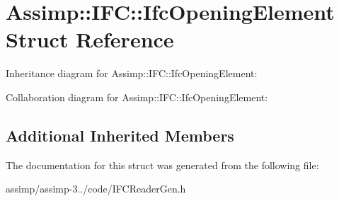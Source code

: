 \hypertarget{struct_assimp_1_1_i_f_c_1_1_ifc_opening_element}{\section{Assimp\+:\+:I\+F\+C\+:\+:Ifc\+Opening\+Element Struct Reference}
\label{struct_assimp_1_1_i_f_c_1_1_ifc_opening_element}
}


Inheritance diagram for Assimp\+:\+:I\+F\+C\+:\+:Ifc\+Opening\+Element\+:


Collaboration diagram for Assimp\+:\+:I\+F\+C\+:\+:Ifc\+Opening\+Element\+:
\subsection*{Additional Inherited Members}


The documentation for this struct was generated from the following file\+:\begin{DoxyCompactItemize}
\item 
assimp/assimp-\/3../code/I\+F\+C\+Reader\+Gen.\+h\end{DoxyCompactItemize}

